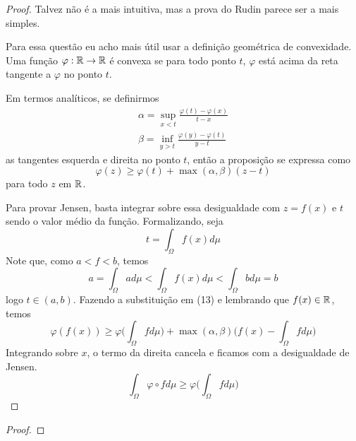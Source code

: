\begin{problem}
    \label{prob:l5:3}
\end{problem}
\begin{proof}
    Talvez não é a mais intuitiva, mas a prova do Rudin parece ser a mais simples.
    
    Para essa questão eu acho mais útil usar a definição geométrica de convexidade. 
    Uma função $\varphi : \mathbb{R} \rightarrow \mathbb{R}$ é convexa se para todo ponto $t$, $\varphi$ está acima da reta tangente 
    a $\varphi$ no ponto $t$. 
    
    Em termos analíticos, se definirmos
    \begin{align*}
        \alpha = \sup_{x < t} \frac{\varphi(t) - \varphi(x)}{t - x}\\
        \beta = \inf_{y > t} \frac{\varphi(y) - \varphi(t)}{y - t}
    \end{align*}
    as tangentes esquerda e direita no ponto $t$, então a proposição se expressa como 
    \begin{equation}
        \varphi(z) \geq \varphi(t) + \max(\alpha,\beta)(z - t)
    \end{equation}
    para todo $z$ em $\mathbb{R}$.

    Para provar Jensen, basta integrar sobre essa desigualdade com $z = f(x)$ e $t$ sendo o valor médio da função.
    Formalizando, seja 
    $$t = \int_{\Omega}f(x) d\mu$$
    Note que, como $a < f < b$, temos 
    $$ a = \int_{\Omega} a d\mu < \int_{\Omega}f(x) d\mu < \int_{\Omega} b d\mu = b$$
    logo $t \in (a,b)$. Fazendo a substituição em (13) e lembrando que $f(x) \in \mathbb{R}$, temos 
    $$\varphi(f(x)) \geq \varphi\bigg(\int_\Omega f d\mu\bigg) + \max(\alpha,\beta)\bigg(f(x) - \int_\Omega f d\mu\bigg)$$
    Integrando sobre $x$, o termo da direita cancela e ficamos com a desigualdade de Jensen.
    $$\int_\Omega \varphi \circ f d\mu \geq \varphi\bigg(\int_\Omega f d\mu\bigg)$$
\end{proof}

\begin{problem}
    \label{prob:l5:4}
\end{problem}

\begin{problem}
    \label{prob:l5:5}
\end{problem}
\begin{proof}
\end{proof}
